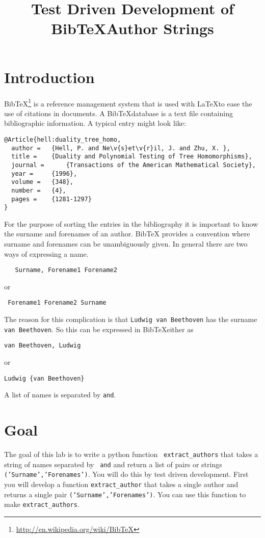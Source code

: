 \documentclass[10pt]{paper}
\title{Test Driven Development of Bib\TeX Author Strings}
\begin{document}
\maketitle
\section*{Introduction}
Bib\TeX\footnote{\url{http://en.wikipedia.org/wiki/BibTeX}} is a
reference management system that is used with La\TeX to ease the use
of citations in documents. A Bib\TeX database is a text file
containing bibliographic information. A typical entry might look like:
\begin{verbatim}
@Article{hell:duality_tree_homo,
  author = 	 {Hell, P. and Ne\v{s}et\v{r}il, J. and Zhu, X. },
  title = 	 {Duality and Polynomial Testing of Tree Homomorphisms},
  journal = 	 {Transactions of the American Mathematical Society},
  year = 	 {1996},
  volume =	 {348},
  number =	 {4},
  pages =	 {1281-1297}
}
\end{verbatim}

For the purpose of sorting the entries in the bibliography it is
important to know the surname and forenames of an author. Bib\TeX
provides a convention where surname and forenames can be unambiguously
given. In general there are two ways of expressing a name.
\begin{verbatim}
   Surname, Forename1 Forename2
\end{verbatim}
or
\begin{verbatim}
 Forename1 Forename2 Surname
\end{verbatim}
The reason for this complication is that {\tt Ludwig van Beethoven}
has the surname {\tt van Beethoven}. So this can be expressed in
Bib\TeX either as 
\begin{verbatim}
van Beethoven, Ludwig
\end{verbatim}
or
\begin{verbatim}
Ludwig {van Beethoven}
\end{verbatim}

A list of names is separated by {\tt and}. 

\section*{Goal}
The goal of this lab is to write a python function {\tt
  extract\_authors} that takes a string of names separated by {\tt
  and}  and return a list of pairs or strings {\tt
  ('Surname','Forenames')}.
You will do this by test driven development. First you will develop a
function {\tt extract\_author} that takes a single author and returns a
single pair {\tt   ('Surname','Forenames')}.  You can use this
function to make {\tt extract\_authors}.
\end{document}
